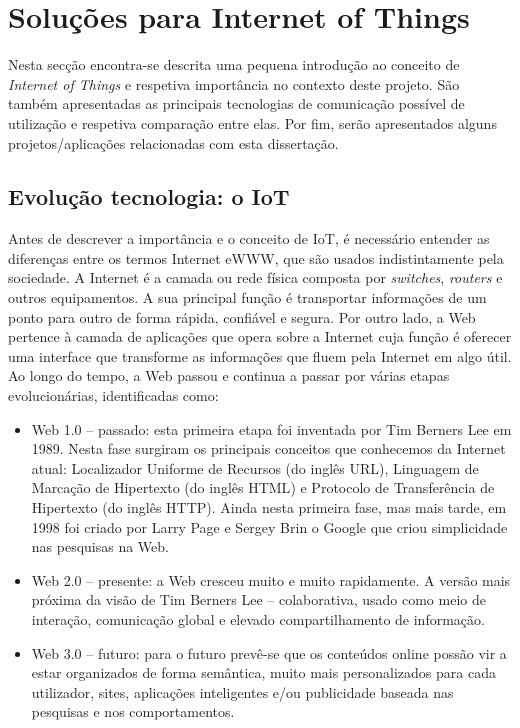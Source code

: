 
\chapter{Soluções para Internet of Things}

Nesta secção encontra-se descrita uma pequena introdução ao conceito de \textit{Internet of Things} e respetiva importância no contexto deste projeto. São também apresentadas as principais tecnologias de comunicação possível de utilização e respetiva comparação entre elas. Por fim, serão apresentados alguns projetos/aplicações relacionadas com esta dissertação.  





\section{Evolução tecnologia: o IoT}


Antes de descrever a importância e o conceito de \ac{IoT}, é necessário entender as diferenças entre os termos Internet e\ac{WWW}, que 	são usados indistintamente pela sociedade. A Internet é a camada ou rede física composta por \textit{switches}, \textit{routers} e outros equipamentos\cite{Evans2011a}. A sua principal função é transportar informações de um ponto para outro de forma rápida, confiável e segura. Por outro lado, a Web pertence à camada de aplicações que opera sobre a Internet cuja função é oferecer uma interface que transforme as informações que fluem pela Internet em algo útil. Ao longo do tempo, a Web passou e continua a passar por várias etapas evolucionárias, identificadas como:

\begin{itemize}
	\item Web 1.0 – passado: esta primeira etapa foi inventada por Tim Berners Lee em 1989\cite{Getting}. Nesta fase surgiram os principais conceitos que conhecemos da Internet atual: Localizador Uniforme de Recursos (do inglês \ac{URL}), Linguagem de Marcação de Hipertexto (do inglês \ac{HTML}) e Protocolo de Transferência de Hipertexto (do inglês \ac{HTTP}). Ainda nesta primeira fase, mas mais tarde, em 1998 foi criado por Larry Page e Sergey Brin o Google que criou simplicidade nas pesquisas na Web\cite{Lovato2014}. 
	
	\item Web 2.0 – presente: a Web cresceu muito e muito rapidamente. A versão mais próxima da visão de Tim Berners Lee – colaborativa, usado como meio de interação, comunicação global e elevado compartilhamento de informação. 
	
	\item Web 3.0 – futuro: para o futuro prevê-se que os conteúdos online possão vir a estar organizados de forma semântica, muito mais personalizados para cada utilizador, sites, aplicações inteligentes e/ou publicidade baseada nas pesquisas e nos comportamentos.
\end{itemize}

